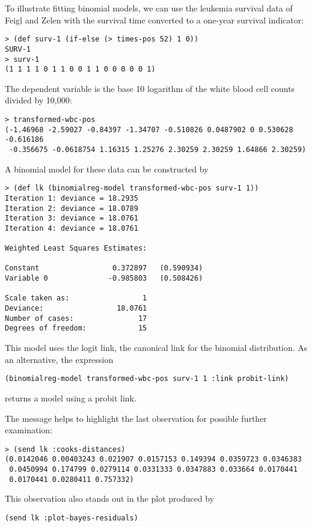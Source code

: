 To illustrate fitting binomial models, we can use the leukemia survival
data of Feigl and Zelen \cite[Section 2.8.3]{LS} with the survival
time converted to a one-year survival indicator:
\begin{verbatim}
> (def surv-1 (if-else (> times-pos 52) 1 0))
SURV-1
> surv-1
(1 1 1 1 0 1 1 0 0 1 1 0 0 0 0 0 1)
\end{verbatim}
The dependent variable is the base 10 logarithm of the white blood
cell counts divided by 10,000:
\begin{verbatim}
> transformed-wbc-pos
(-1.46968 -2.59027 -0.84397 -1.34707 -0.510826 0.0487902 0 0.530628 -0.616186
 -0.356675 -0.0618754 1.16315 1.25276 2.30259 2.30259 1.64866 2.30259)
\end{verbatim}
A binomial model for these data can be constructed by
\begin{verbatim}
> (def lk (binomialreg-model transformed-wbc-pos surv-1 1))
Iteration 1: deviance = 18.2935
Iteration 2: deviance = 18.0789
Iteration 3: deviance = 18.0761
Iteration 4: deviance = 18.0761

Weighted Least Squares Estimates:

Constant                 0.372897   (0.590934)
Variable 0              -0.985803   (0.508426)

Scale taken as:                 1
Deviance:                 18.0761
Number of cases:               17
Degrees of freedom:            15
\end{verbatim}
This model uses the logit link, the canonical link for the binomial
distribution. As an alternative, the expression
\begin{verbatim}
(binomialreg-model transformed-wbc-pos surv-1 1 :link probit-link)
\end{verbatim}
returns a model using a probit link.

The  message helps to highlight the last
observation for possible further examination:
\begin{verbatim}
> (send lk :cooks-distances)
(0.0142046 0.00403243 0.021907 0.0157153 0.149394 0.0359723 0.0346383
 0.0450994 0.174799 0.0279114 0.0331333 0.0347883 0.033664 0.0170441 
 0.0170441 0.0280411 0.757332)
\end{verbatim}
This observation also stands out in the plot produced by
\begin{verbatim}
(send lk :plot-bayes-residuals)
\end{verbatim}


